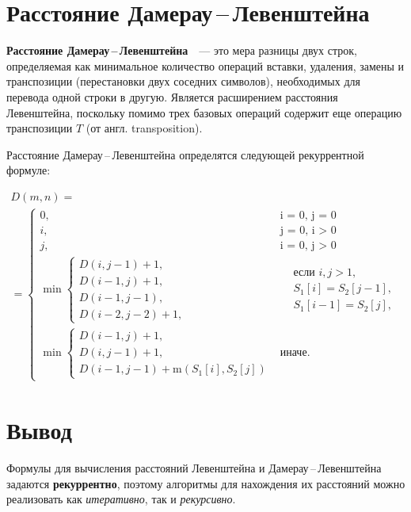 \section{Расстояние Дамерау\,--\,Левенштейна}

\textbf{Расстояние Дамерау\,--\,Левенштейна}~\cite{analysis-lev-damlev}~--- это мера разницы двух строк, определяемая как минимальное количество операций вставки, удаления, замены и транспозиции (перестановки двух соседних символов), необходимых для перевода одной строки в другую. Является расширением расстояния Левенштейна, поскольку помимо трех базовых операций содержит еще операцию транспозиции $T$ (от англ. transposition).

Расстояние Дамерау\,--\,Левенштейна определятся следующей рекуррентной формуле:

\begin{multline}
    D(m, n) =\\ =
    \begin{cases}
        0, &\text{i = 0, j = 0}\\
        i, &\text{j = 0, i > 0}\\
        j, &\text{i = 0, j > 0}\\
        \min
        \begin{cases}
            D(i, j - 1) + 1,\\
            D(i - 1, j) + 1,\\
            D(i - 1, j - 1),\\
            D(i - 2, j - 2) + 1,
        \end{cases} 
        &\begin{aligned}
            & \text{если $i, j > 1$}, \\
            & S_{1}[i] = S_{2}[j - 1], \\
            & S_{1}[i - 1] = S_{2}[j],
        \end{aligned} \\
        \min
        \begin{cases}
            D(i - 1, j) + 1, \\
            D(i, j - 1) + 1, \\
            D(i - 1, j - 1) + \text{m}(S_1[i], S_2[j])
        \end{cases} &\text{иначе.}
    \end{cases}
    \label{eqn:recur-damlev}
\end{multline}

\section*{Вывод}
Формулы для вычисления расстояний Левенштейна и \break Дамерау\,--\,Левенштейна задаются \textbf{рекуррентно}, поэтому алгоритмы для нахождения их расстояний можно реализовать как \textit{итеративно}, так и \textit{рекурсивно}.
